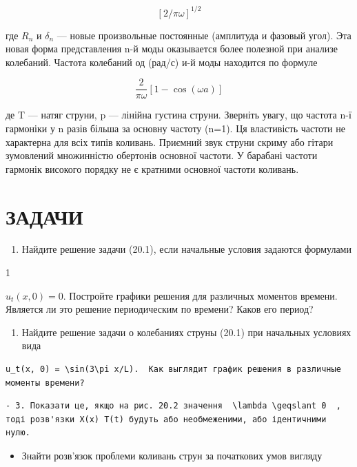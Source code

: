 \documentclass[
  ukrainian,
]{article}
\providecommand{\tightlist}{%
  \setlength{\itemsep}{0pt}\setlength{\parskip}{0pt}}
\begin{document}
\[
[2/\pi\omega]^{1/2}
\]

где \(R_n\) и \(\delta_n\) --- новые произвольные постоянные (амплитуда
и фазовый угол). Эта новая форма представления n-й моды оказывается
более полезной при анализе колебаний. Частота колебаний од (рад/с) и-й
моды находится по формуле

\[
\frac{2}{\pi\omega} [1-\cos(\omega a)]
\]

де T --- натяг струни, p --- лінійна густина струни. Зверніть увагу, що
частота n-ї гармоніки у n разів більша за основну частоту (n=1). Ця
властивість частоти не характерна для всіх типів коливань. Приємний звук
струни скриму або гітари зумовлений множинністю обертонів основної
частоти. У барабані частоти гармонік високого порядку не є кратними
основної частоти коливань.

\section{ЗАДАЧИ}\label{ux437ux430ux434ux430ux447ux438-1}

\begin{enumerate}
\def\labelenumi{\arabic{enumi}.}
\tightlist
\item
  Найдите решение задачи (20.1), если начальные условия задаются
  формулами
\end{enumerate}

1

\(u_t(x, 0) = 0.\) Постройте графики решения для различных моментов
времени. Является ли это решение периодическим по времени? Каков его
период?

\begin{enumerate}
\def\labelenumi{\arabic{enumi}.}
\setcounter{enumi}{1}
\tightlist
\item
  Найдите решение задачи о колебаниях струны (20.1) при начальных
  условиях вида
\end{enumerate}

\begin{verbatim}
u_t(x, 0) = \sin(3\pi x/L).  Как выглядит график решения в различные моменты времени?
\end{verbatim}

\begin{verbatim}
- 3. Показати це, якщо на рис. 20.2 значення  \lambda \geqslant 0  , тоді розв'язки X(x) T(t) будуть або необмеженими, або ідентичними нулю.
\end{verbatim}

\begin{itemize}
\tightlist
\item
  Знайти розв'язок проблеми коливань струн за початкових умов вигляду
\end{itemize}
\end{document}
